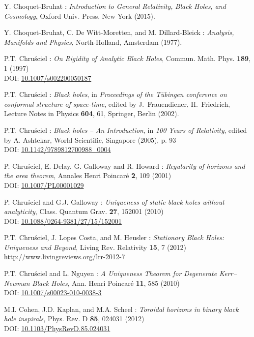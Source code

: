 \begin{thebibliography}{123}
Y. Choquet-Bruhat : {\em Introduction to General Relativity, Black Holes, and
Cosmology}, Oxford Univ. Press, New York (2015).

Y. Choquet-Bruhat, C. De Witt-Moretten, and M. Dillard-Bleick :
{\em Analysis, Manifolds and Physics},
North-Holland, Amsterdam (1977).

P.T. Chru\'sciel : {\em On Rigidity of Analytic Black Holes},
Commun. Math. Phys. {\bf 189}, 1 (1997) \\
DOI: \href{http://dx.doi.org/10.1007/s002200050187}{10.1007/s002200050187}

P.T. Chru\'sciel : {\em Black holes},
in {\em Proceedings of the T\"ubingen conference on conformal structure of
space-time}, edited by J.~Frauendiener, H.~Friedrich,
Lecture Notes in Physics {\bf 604}, 61,
Springer, Berlin (2002).

P.T. Chru\'sciel : {\em Black holes -- An Introduction},
in {\em 100 Years of Relativity}, edited by A. Ashtekar,
World Scientific, Singapore (2005), p. 93\\
DOI: \href{https://doi.org/10.1142/9789812700988_0004}{10.1142/9789812700988\_0004}

P. Chru\'sciel, E. Delay, G. Galloway and R. Howard :
{\em Regularity of horizons and the area theorem},
Annales Henri Poincar\'e {\bf 2}, 109 (2001)\\
DOI: \href{http://dx.doi.org/10.1007/PL00001029}{10.1007/PL00001029}

P. Chru\'sciel and G.J. Galloway :
{\em Uniqueness of static black holes without analyticity},
Class. Quantum Grav. {\bf 27}, 152001 (2010)\\
DOI: \href{http://dx.doi.org/10.1088/0264-9381/27/15/152001}{10.1088/0264-9381/27/15/152001}

P.T. Chru\'sciel, J. Lopes Costa, and M. Heusler :
{\em Stationary Black Holes: Uniqueness and Beyond},
Living Rev. Relativity {\bf 15}, 7 (2012) \\
\url{http://www.livingreviews.org/lrr-2012-7}

P.T. Chru\'sciel and L. Nguyen :
{\em A Uniqueness Theorem for Degenerate Kerr–Newman Black Holes},
Ann. Henri Poincar\'e {\bf 11}, 585 (2010)\\
DOI: \href{http://dx.doi.org/10.1007/s00023-010-0038-3}{10.1007/s00023-010-0038-3}

M.I. Cohen, J.D. Kaplan, and M.A. Scheel :
{\em Toroidal horizons in binary black hole inspirals},
Phys. Rev. D {\bf 85}, 024031 (2012)\\
DOI:  \href{http://dx.doi.org/10.1103/PhysRevD.85.024031}{10.1103/PhysRevD.85.024031}


\end{thebibliography}
